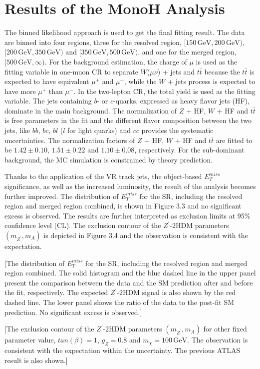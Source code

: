 \documentclass[class=NTHU_thesis, crop=false]{standalone}
\begin{document}
\section{Results of the MonoH Analysis}
The binned likelihood approach is used to get the final fitting result. The data are binned into four regions, three for the resolved region, $[150\, \mathrm{GeV}, 200\, \mathrm{GeV})$, $[200\, \mathrm{GeV}, 350\, \mathrm{GeV})$ and $[350\, \mathrm{GeV}, 500\, \mathrm{GeV})$, and one for the merged region, $[500\, \mathrm{GeV}, \infty)$. For the background estimation, the charge of $\mu$ is used as the fitting variable in one-muon CR to separate $W$($\mu\nu$) + jets and $t\bar{t}$ because the $t\bar{t}$ is expected to have equivalent $\mu^+$ and $\mu^-$, while the $W$ + jets process is expected to have more $\mu^+$ than $\mu^-$. In the two-lepton CR, the total yield is used as the fitting variable. The jets containing $b$- or $c$-quarks, expressed as heavy flavor jets (HF), dominate in the main background. The normalization of $Z$ + HF, $W$ + HF and $t\bar{t}$ is free parameters in the fit and the different flavor composition between the two jets, like $bb$, $bc$, $bl$ ($l$ for light quarks) and $cc$ provides the systematic uncertainties. The normalization factors of $Z$ + HF, $W$ + HF and $t\bar{t}$ are fitted to be $1.42 \pm 0.10$, $1.51 \pm 0.22$ and $1.10 \pm 0.08$, respectively. For the sub-dominant background, the MC simulation is constrained by theory prediction.

Thanks to the application of the VR track jets, the object-based $E^{miss}_T$ significance, as well as the increased luminosity, the result of the analysis becomes further improved. The distribution of $E^{miss}_T$ for the SR, including the resolved region and merged region combined, is shown in Figure 3.3 and no significant excess is observed. The results are further interpreted as exclusion limits at 95\% confidence level (CL). The exclusion contour of the $Z^\prime$-2HDM parameters $(m_{Z^\prime}, m_A)$ is depicted in Figure 3.4 and the observation is consistent with the expectation.

[The distribution of $E^{miss}_T$ for the SR, including the resolved region and merged region combined. The solid histogram and the blue dashed line in the upper panel present the comparison between the data and the SM prediction after and before the fit, respectively. The expected $Z^\prime$-2HDM signal is also shown by the red dashed line. The lower panel shows the ratio of the data to the post-fit SM prediction. No significant excess is observed.]

[The exclusion contour of the $Z^\prime$-2HDM parameters $(m_{Z^\prime}, m_A)$ for other fixed parameter value, $tan(\beta) = 1$, $g_Z = 0.8$ and $m_\chi = 100\, \mathrm{GeV}$. The observation is consistent with the expectation within the uncertainty. The previous ATLAS result is also shown.]
\end{document}
